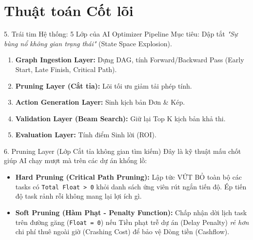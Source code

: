 \documentclass[aspectratio=169]{beamer}
\begin{document}
\section{Thuật toán Cốt lõi}

\begin{frame}{5. Trái tim Hệ thống: 5 Lớp của AI Optimizer Pipeline}
    Mục tiêu: Dập tắt \textit{"Sự bùng nổ không gian trạng thái"} (State Space Explosion).
    \vspace{0.2cm}
    \begin{enumerate}
        \item \textbf{Graph Ingestion Layer:} Dựng DAG, tính Forward/Backward Pass (Early Start, Late Finish, Critical Path).
        \item \textbf{Pruning Layer (Cắt tỉa):} Lõi tối ưu giảm tải phép tính.
        \item \textbf{Action Generation Layer:} Sinh kịch bản Đơn \& Kép.
        \item \textbf{Validation Layer (Beam Search):} Giữ lại Top K kịch bản khả thi.
        \item \textbf{Evaluation Layer:} Tính điểm Sinh lời (ROI).
    \end{enumerate}
\end{frame}

\begin{frame}{6. Pruning Layer (Lớp Cắt tỉa không gian tìm kiếm)}
    Đây là kỹ thuật mấu chốt giúp AI chạy mượt mà trên các dự án khổng lồ:
    \vspace{0.3cm}
    \begin{itemize}
        \item \textbf{Hard Pruning (Critical Path Pruning):} 
        Lập tức VỨT BỎ toàn bộ các tasks có \texttt{Total Float > 0} khỏi danh sách ứng viên rút ngắn tiến độ. Ép tiến độ task rảnh rỗi không mang lại lợi ích gì.
        \item \textbf{Soft Pruning (Hàm Phạt - Penalty Function):} 
        Chấp nhận dời lịch task trên đường găng (\texttt{Float = 0}) nếu Tiền phạt trễ dự án (Delay Penalty) \textit{rẻ hơn} chi phí thuê ngoài giờ (Crashing Cost) để bảo vệ Dòng tiền (Cashflow).
    \end{itemize}
\end{frame}
\end{document}
